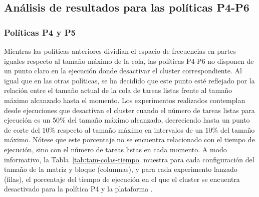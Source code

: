 
\subsection{Análisis de resultados para las políticas P4-P6}

\subsubsection{Políticas P4 y P5}

Mientras las políticas anteriores dividían el espacio de frecuencias en
partes iguales respecto al tamaño máximo de la cola, las políticas P4-P6 no
disponen de un punto claro en la ejecución donde desactivar el cluster
correspondiente. Al igual que en las otras políticas, se ha decidido que
este punto esté reflejado por la relación entre el tamaño actual de la cola
de tareas listas frente al tamaño máximo alcanzado hasta el momento. Los
experimentos realizados contemplan desde ejecuciones que desactivan el
cluster cuando el número de tareas listas para ejecución es un $50\%$ del
tamaño máximo alcanzado, decreciendo hasta un punto de corte del $10\%$
respecto al tamaño máximo en intervalos de un $10\%$ del tamaño máximo.
Nótese que este porcentaje no se encuentra relacionado con el tiempo de
ejecución, sino con el número de tareas listas en cada momento. A modo
informativo, la Tabla~\ref{tab:tam-colas-tiempo} muestra para cada
configuración del tamaño de la matriz y bloque (columnas), y para cada
experimento lanzado (filas), el porcentaje del tiempo de ejecución en el
que el cluster se encuentra desactivado para la política P4 y la plataforma
\juno.

